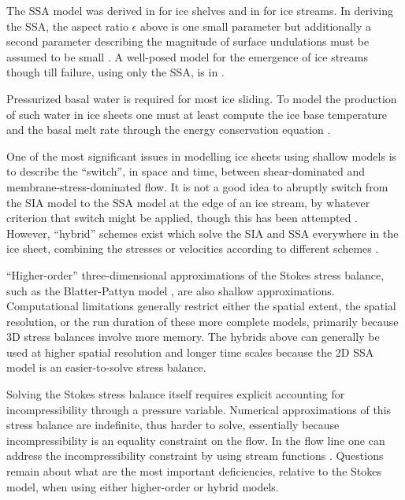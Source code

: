 \documentclass[letterpaper,final,12pt,reqno]{amsart}
\newcommand{\eps}{\epsilon}
\begin{document}
The SSA model \cite{WeisGreveHutter} was derived in \cite{Morland} for ice shelves and in \cite{MacAyeal} for ice streams.  In deriving the SSA, the aspect ratio $\eps$ above is one small parameter but additionally a second parameter describing the magnitude of surface undulations must be assumed to be small  \cite{SchoofStream,SchoofHindmarsh}.  A well-posed model for the emergence of ice streams though till failure, using only the SSA, is in \cite{SchoofStream}.

Pressurized basal water is required for most ice sliding.  To model the production of such water in ice sheets one must at least compute the ice base temperature and the basal melt rate through the energy conservation equation \cite{BBssasliding,Clarke05,Raymondenergy,Tulaczyketal2000b}.

One of the most significant issues in modelling ice sheets using shallow models is to describe the ``switch'', in space and time, between shear-dominated and membrane-stress-dominated flow.  It is not a good idea to abruptly switch from the SIA model to the SSA model at the edge of an ice stream, by whatever criterion that switch might be applied, though this has been attempted \cite{HulbeMacAyeal,Ritzetal2001}.  However, ``hybrid'' schemes exist which solve the SIA and SSA everywhere in the ice sheet, combining the stresses or velocities according to different schemes \cite{BBssasliding,Goldberg2011,PollardDeConto,Winkelmannetal2011}.

``Higher-order'' three-dimensional approximations of the Stokes stress balance, such as the Blatter-Pattyn model \cite{Blatter,Pattyn03}, are also shallow approximations.  Computational limitations generally restrict either the spatial extent, the spatial resolution, or the run duration of these more complete models, primarily because 3D stress balances involve more memory.  The hybrids above can generally be used at higher spatial resolution and longer time scales because the 2D SSA model is an easier-to-solve stress balance.

Solving the Stokes stress balance itself \cite{JouvetRappaz2011,Lengetal2012,ISMIPHOM} requires explicit accounting for incompressibility through a pressure variable.  Numerical approximations of this stress balance are indefinite, thus harder to solve, essentially because incompressibility is an equality constraint on the flow.  In the flow line one can address the incompressibility constraint by using stream functions \cite{BaliseRaymond1985}.  Questions remain about what are the most important deficiencies, relative to the Stokes model, when using either higher-order \cite{ISMIPHOM} or hybrid models.
\end{document}
